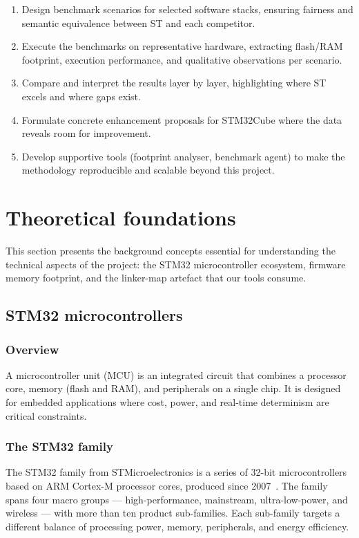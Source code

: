 \begin{enumerate}
\item Design benchmark scenarios for selected software stacks, ensuring fairness and
semantic equivalence between ST and each competitor.
\item Execute the benchmarks on representative hardware, extracting flash/RAM footprint,
execution performance, and qualitative observations per scenario.
\item Compare and interpret the results layer by layer, highlighting where ST excels and
where gaps exist.
\item Formulate concrete enhancement proposals for STM32Cube where the data reveals room
for improvement.
\item Develop supportive tools (footprint analyser, benchmark agent) to make the
methodology reproducible and scalable beyond this project.
\end{enumerate}

\section{Theoretical foundations}
\label{sec:theory}

This section presents the background concepts essential for understanding the technical
aspects of the project: the STM32 microcontroller ecosystem, firmware memory footprint, and
the linker-map artefact that our tools consume.

\subsection{STM32 microcontrollers}
\label{sec:stm32-overview}

\subsubsection{Overview}

A microcontroller unit (MCU) is an integrated circuit that combines a processor core,
memory (flash and RAM), and peripherals on a single chip. It is designed for embedded
applications where cost, power, and real-time determinism are critical constraints.

\subsubsection{The STM32 family}

The STM32 family from STMicroelectronics is a series of 32-bit microcontrollers based on
ARM Cortex-M processor cores, produced since 2007~\cite{stm32-family}. The family spans
four macro groups --- high-performance, mainstream, ultra-low-power, and wireless --- with
more than ten product sub-families. Each sub-family targets a different balance of
processing power, memory, peripherals, and energy efficiency.

